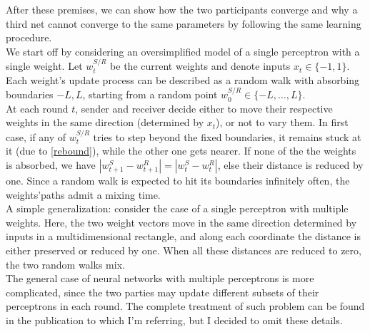 \documentclass[%
    corpo=11pt,
    twoside,
    stile=classica,
    oldstyle,
    autoretitolo,
    tipotesi=magistrale,
    greek,
    evenboxes,
    english
]{toptesi}
\begin{document}
After these premises, we can show how the two participants converge and why a third net cannot converge to the same parameters by following the same learning procedure. \\
 We start off by considering an oversimplified model of a single perceptron with a single weight. \iftrue Let $w^{S/R}_{t}$  be the current weights and denote inputs $x_{t} \in \{-1,1\} $. \fi Each weight's update process can be described as a random walk with absorbing boundaries $-L,L$, starting from a random point $w^{S/R}_{0}\in\{-L,\dots ,L\}$. \\
At each round $t$, sender and receiver decide either to move their respective weights in the same direction (determined by $x_t$), or not to vary them. In first case, if any of $w^{S/R}_t$ tries to step beyond the fixed boundaries, it remains stuck at it (due to \ref{rebound}), while the other one gets nearer.  If none of the the weights is absorbed, we have $|w_{t+1}^S - w_{t+1}^R| = |w_{t}^S - w_{t}^R|$, else their distance is reduced by one. Since a random walk is expected to hit its boundaries infinitely often, the weights'paths admit a mixing time. \\
A simple generalization: consider the case of a single perceptron with multiple weights. Here, the two weight vectors move in the same direction determined by inputs in a multidimensional rectangle, and along each coordinate the distance is either preserved or reduced by one. When all these distances are reduced to zero, the two random walks mix. \\
The general case of neural networks with multiple perceptrons is more complicated, since the two parties may update different subsets of their perceptrons in each round. The complete treatment of such problem can be found in the publication to which I'm referring, but I decided to omit these details.
\end{document}
